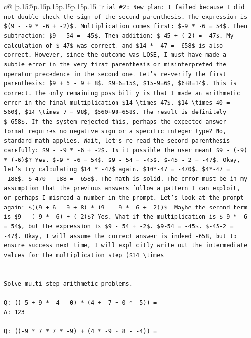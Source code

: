 \documentclass{article}
\begin{document}
{\begin{supertabular}{c@{$\;$}|p{.15\linewidth}@{}p{.15\linewidth}p{.15\linewidth}p{.15\linewidth}p{.15\linewidth}p{.15\linewidth}}
{{{\texttt{Trial \#2: New plan: I failed because I did not double{-}check the sign of the second parenthesis. The expression is \$(9 {-} {-}9 * {-}6 + {-}2)\$. Multiplication comes first: \${-}9 * {-}6 = 54\$. Then subtraction: \$9 {-} 54 = {-}45\$. Then addition: \${-}45 + ({-}2) = {-}47\$. My calculation of \${-}47\$ was correct, and \$14 * {-}47 = {-}658\$ is also correct. However, since the outcome was LOSE, I must have made a subtle error in the very first parenthesis or misinterpreted the operator precedence in the second one. Let's re{-}verify the first parenthesis: \$9 + 6 {-} 9 + 8\$. \$9+6=15\$, \$15{-}9=6\$, \$6+8=14\$. This is correct. The only remaining possibility is that I made an arithmetic error in the final multiplication \$14 \textbackslash{}times 47\$. \$14 \textbackslash{}times 40 = 560\$, \$14 \textbackslash{}times 7 = 98\$, \$560+98=658\$. The result is definitely \${-}658\$. If the system rejected this, perhaps the expected answer format requires no negative sign or a specific integer type? No, standard math applies. Wait, let's re{-}read the second parenthesis carefully: \$9 {-} {-}9 * {-}6 + {-}2\$. Is it possible the user meant \$9 {-} ({-}9) * ({-}6)\$? Yes. \${-}9 * {-}6 = 54\$. \$9 {-} 54 = {-}45\$. \${-}45 {-} 2 = {-}47\$. Okay, let's try calculating \$14 * {-}47\$ again. \$10*{-}47 = {-}470\$. \$4*{-}47 = {-}188\$. \${-}470 {-} 188 = {-}658\$. The math is solid. The error must be in my assumption that the previous answers follow a pattern I can exploit, or perhaps I misread a number in the prompt. Let's look at the prompt again: \$((9 + 6 {-} 9 + 8) * (9 {-} {-}9 * {-}6 + {-}2))\$. Maybe the second term is \$9 {-} ({-}9 * {-}6) + ({-}2)\$? Yes. What if the multiplication is \${-}9 * {-}6 = 54\$, but the expression is \$9 {-} 54 + {-}2\$. \$9{-}54 = {-}45\$. \${-}45{-}2 = {-}47\$. Okay, I will assume the correct answer is indeed {-}658, but to ensure success next time, I will explicitly write out the intermediate values for the multiplication step (\$14 \textbackslash{}times} \\
\\ 
\\ 
\texttt{Solve multi{-}step arithmetic problems.} \\
\\ 
\texttt{Q: (({-}5 + 9 * {-}4 {-} 0) * (4 + {-}7 + 0 * {-}5)) =} \\
\texttt{A: 123} \\
\\ 
\texttt{Q: (({-}9 * 7 * 7 * {-}9) + (4 * {-}9 {-} 8 {-} {-}4)) =} \\
}}}
\end{supertabular}}
\end{document}

